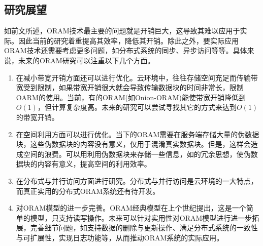 \subsection{研究展望}
如前文所述，ORAM技术最主要的问题就是开销巨大，这导致其难以应用于实际。因此当前的研究着重提高其效率，降低其开销。除此之外，要实际应用ORAM技术还需要考虑更多问题，如分布式系统的同步、异步访问等等。具体来说，未来的ORAM研究可以注重以下几个方面。
\begin{enumerate}
    \item 在减小带宽开销方面还可以进行优化。云环境中，往往存储空间充足而传输带宽受到限制，如果带宽开销很大就会导致传输数据块的时间非常长，限制OARM的使用。当前，有的ORAM(如Onion-ORAM\cite{ref13})能使带宽开销降低到$O(1)$，但计算复杂度高。未来的研究可以尝试寻找其它的方式来达到$O(1)$的带宽开销。
    \item 在空间利用方面可以进行优化。当下的ORAM需要在服务端存储大量的伪数据块，这些伪数据块的内容没有意义，仅用于混淆真实数据块。但是，这样会造成空间的浪费。可以用利用伪数据块来存储一些信息，如\cite{ref12}的冗余思想，使伪数据块的内容有意义，提高空间的利用效率。
    \item 在分布式与并行访问方面进行研究。分布式与并行访问是云环境的一大特点，而真正实用的分布式ORAM系统还有待开发。
    \item 对ORAM模型的进一步完善。ORAM经典模型在上个世纪提出，这是一个简单的模型，只支持读写操作。未来可以针对实用性对ORAM模型进行进一步拓展，完善细节问题，如支持数据的删除与更新操作、满足分布式系统的一致性与可扩展性，实现日志功能等，从而推动ORAM系统的实际应用。
\end{enumerate}